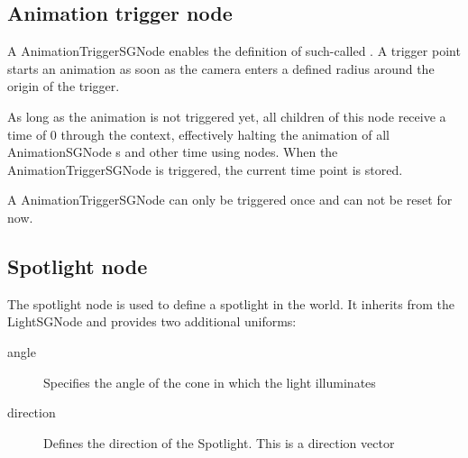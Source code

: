 \subsection*{Animation trigger node} \label{subsec:animationTriggerNode}
A AnimationTriggerSGNode enables the definition of such-called .
A trigger point starts an animation as soon as the camera enters a defined radius around the origin of the trigger.

As long as the animation is not triggered yet, all children of this node receive a time of 0 through the context,
effectively halting the animation of all AnimationSGNode s and other time using nodes.
When the AnimationTriggerSGNode is triggered, the current time point is stored.

A AnimationTriggerSGNode can only be triggered once and can not be reset for now.

\subsection*{Spotlight node} \label{subsec:spotlightNode}
The spotlight node is used to define a spotlight in the world.
It inherits from the LightSGNode and provides two additional uniforms:
\begin{description}
	\item[angle] Specifies the angle of the cone in which the light illuminates
	\item[direction] Defines the direction of the Spotlight. This is a direction vector
\end{description}